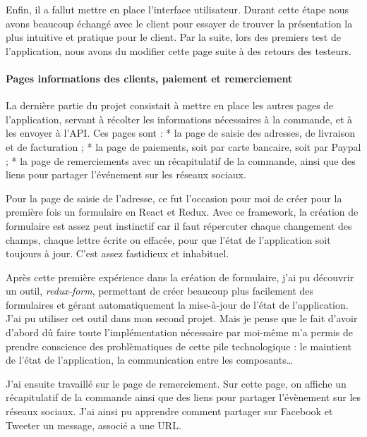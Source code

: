 \bigskip

Enfin, il a fallut mettre en place l'interface utilisateur. Durant cette
étape nous avons beaucoup échangé avec le client pour essayer de trouver
la présentation la plus intuitive et pratique pour le client. Par la
suite, lors des premiers test de l'application, nous avons du modifier
cette page suite à des retours des testeurs.

\paragraph{Pages informations des clients, paiement et
remerciement}\label{pages-informations-des-clients-paiement-et-remerciement}

\bigskip

La dernière partie du projet consistait à mettre en place les autres
pages de l'application, servant à récolter les informations nécessaires
à la commande, et à les envoyer à l'API. Ces pages sont : * la page de
saisie des adresses, de livraison et de facturation ; * la page de
paiements, soit par carte bancaire, soit par Paypal ; * la page de
remerciements avec un récapitulatif de la commande, ainsi que des liens
pour partager l'événement sur les réseaux sociaux.

\bigskip

Pour la page de saisie de l'adresse, ce fut l'occasion pour moi de créer
pour la première fois un formulaire en React et Redux. Avec ce
framework, la création de formulaire est assez peut instinctif car il
faut répercuter chaque changement des champs, chaque lettre écrite ou
effacée, pour que l'état de l'application soit toujours à jour. C'est
assez fastidieux et inhabituel.

\bigskip

Après cette première expérience dans la création de formulaire, j'ai pu
découvrir un outil, \emph{redux-form}, permettant de créer beaucoup plus
facilement des formulaires et gérant automatiquement la mise-à-jour de
l'état de l'application. J'ai pu utiliser cet outil dans mon second
projet. Mais je pense que le fait d'avoir d'abord dû faire toute
l'implémentation nécessaire par moi-même m'a permis de prendre
conscience des problèmatiques de cette pile technologique : le maintient
de l'état de l'application, la communication entre les
composants\ldots{}

\bigskip

J'ai ensuite travaillé sur le page de remerciement. Sur cette page, on
affiche un récapitulatif de la commande ainsi que des liens pour
partager l'évènement sur les réseaux sociaux. J'ai ainsi pu apprendre
comment partager sur Facebook et Tweeter un message, associé a une URL.

